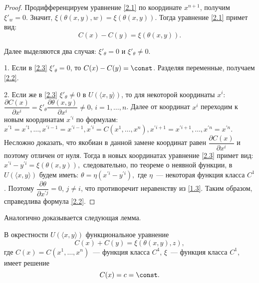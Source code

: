 \begin{proof} Продифференцируем уравнение \eqref{2.1} по координате $x^{n+1}$, получим $\xi'_{w}=0.$ Значит, $\xi(\theta(x,y),w) = \xi(\theta(x,y))$. Тогда уравнение \eqref{2.1} примет вид:
\begin{equation}\label{2.3} C(x) - C(y) = \xi(\theta(x,y)). \end{equation}

Далее выделяются два случая: $\xi'_{\theta}=0$ и $\xi'_{\theta}\ne0$.

1. Если в \eqref{2.3} $\xi'_{\theta}=0$, то $C(x) - C(y) = \const$. Разделяя переменные, получаем \eqref{2.2}.

2. Если же в \eqref{2.3} $\xi'_{\theta}\ne0$ в $U(\langle x,y\rangle)$, то для некоторой координаты $x^i$: $\dfrac{\partial C(x)}{\partial x^i} = \xi'_{\theta}\dfrac{\partial \theta(x,y)}{\partial x^i} \ne0$, $i=1,\ldots,n$. Далее от координат $x^i$ переходим к новым координатам $x^{\prime i}$ по формулам: $x^{\prime 1} = x^{\prime 1},\ldots,x^{\prime i-1} = x^{\prime i-1},x^{\prime i} = C(x^1,\ldots,x^n),x^{\prime i+1} = x^{\prime i+1},\ldots,x^{\prime n} = x^{\prime n}.$ Несложно доказать, что якобиан в данной замене координат равен $\dfrac{\partial C(x)}{\partial x^i}$ и поэтому
отличен от нуля. Тогда в новых координатах уравнение \eqref{2.3} примет вид: $x^{\prime i} - y^{\prime i} = \xi(\theta(x,y)),$ следовательно, по теореме о неявной функции, в $U(\langle x,y\rangle)$ будем иметь: $\theta = \eta(x^{\prime i} - y^{\prime i}),$ где $\eta$~--- некоторая функция класса $C^1$. Поэтому $\dfrac{\partial \theta}{\partial x^{\prime j}}=0$, $j\ne i$, что противоречит неравенству из \eqref{1.3}. Таким образом, справедлива формула \eqref{2.2}. \end{proof}

Аналогично доказывается следующая лемма.

\begin{lem}\label{lll2} В окрестности $U(\langle x,y\rangle)$ функциональное уравнение
$$ C(x) + C(y) = \xi(\theta(x,y),z), $$ где $C(x)= C(x^1,\ldots,x^n)$~--- функция класса $C^4$, $\xi$~--- функция класса $C^1$, имеет решение $$ C(x) = c = \const. $$ \end{lem}


